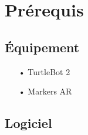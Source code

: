\documentclass[10pt,a4paper]{article}
\begin{document}

\newpage
\tableofcontents
\newpage
	

\section{Prérequis}

\subsection{Équipement}

\begin{itemize}
\item[•] TurtleBot 2
\item[•] Markers AR
\end{itemize}

\subsection{Logiciel}
\end{document}
